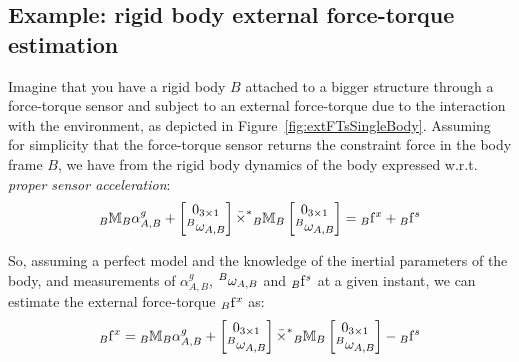 \subsection{Example: rigid body external force-torque estimation}
Imagine that you have a rigid body $B$ attached to a bigger structure through a force-torque sensor and subject to an external force-torque due to the interaction with the environment, as depicted in Figure~\ref{fig:extFTsSingleBody}. Assuming for simplicity that the force-torque sensor returns the constraint force in the body frame $B$, we have from the rigid body dynamics of the body expressed w.r.t. \emph{proper sensor acceleration}:
\begin{equation}
\label{eq:Malphaetcetc}
    \hspace{0em}_B \mathbb{M}_B\alpha^g_{A,B} + \begin{bmatrix} 
0_{3\times1} \\
\hspace{0em}^B \omega_{A,B} 
\end{bmatrix}
\bar{\times}^*
\hspace{0em}_B \mathbb{M}_B
\begin{bmatrix} 
0_{3\times1} \\
\hspace{0em}^B \omega_{A,B} 
\end{bmatrix} = \hspace{0em}_B {\rm f}^x +  \hspace{0em}_B {\rm f}^s
\end{equation}

So, assuming a perfect model and the knowledge of the inertial parameters of the body, and measurements of $\alpha^g_{A,B}$, $\hspace{0em}^B \omega_{A,B}$ and $\hspace{0em}_B {\rm f}^s$ at a given instant, we can estimate the external force-torque $\hspace{0em}_B {\rm f}^x$ as:
\begin{equation}
\label{eq:singleBodyForce}
    \hspace{0em}_B {\rm f}^x = \hspace{0em}_B \mathbb{M}_B \alpha^g_{A,B} + \begin{bmatrix} 
0_{3\times1} \\
\hspace{0em}^B \omega_{A,B} 
\end{bmatrix}
\bar{\times}^*
\hspace{0em}_B \mathbb{M}_B
\begin{bmatrix} 
0_{3\times1} \\
\hspace{0em}^B \omega_{A,B} 
\end{bmatrix} -   \hspace{0em}_B {\rm f}^s 
\end{equation}

